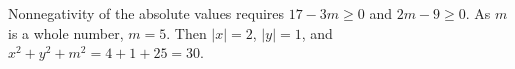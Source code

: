 Nonnegativity of the absolute values requires $17-3m\ge0$ and $2m-9\ge0$. As $m$ is a whole number, $m=5$. Then $|x|=2$, $|y|=1$, and $x^2+y^2+m^2=4+1+25=\boxed{30}$.

